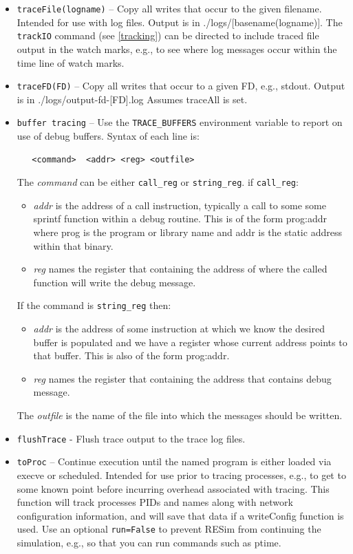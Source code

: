 \documentclass[titlepage]{article}
\begin{document}
\begin{itemize}
\item {\tt traceFile(logname)} – Copy all writes that occur to the given filename.  Intended for use with log files.  Output is in ./logs/[basename(logname)].
The {\tt trackIO} command (see \ref{tracking}) can be directed to include traced file output in the watch marks, e.g., to see where log messages occur within the
time line of watch marks.

\item {\tt traceFD(FD)} – Copy all writes that occur to a given FD, e.g., stdout.  Output is in ./logs/output-fd-[FD].log   Assumes traceAll is set.

\item {\tt buffer tracing} – Use the {\tt TRACE\_BUFFERS} environment variable to report on use of debug buffers.  Syntax of each line is:
\begin{verbatim}
   <command>  <addr> <reg> <outfile>
\end{verbatim}
The \textit{command} can be either {\tt call\_reg} or {\tt string\_reg}. if {\tt call\_reg}:
\begin{itemize}
\item \textit{addr} is the address of a call instruction, typically a call to some some sprintf function within a debug routine. This is of the form prog:addr where prog is the
program or library name and addr is the static address within that binary.
\item \textit{reg} names the register that containing the address of where the called function will write the debug message.
\end{itemize}
If the command is {\tt string\_reg} then:
\begin{itemize}
\item \textit{addr} is the address of some instruction at which we know the desired buffer is populated and we have a register whose current address points to that
buffer.  This is also of the form prog:addr.
\item \textit{reg} names the register that containing the address that contains debug message.
\end{itemize}

The \textit{outfile} is the name of the file into which the messages should be written.

\item {\tt flushTrace} - Flush trace output to the trace log files.

\item {\tt toProc} – Continue execution until the named program is either loaded via execve or scheduled.  Intended for use prior to tracing processes, e.g., to get to some known point before incurring overhead associated with tracing.   This function will track processes PIDs and names along with network configuration information, and will save that data if a writeConfig function is used.
Use an optional {\tt run=False} to prevent RESim from continuing the simulation, e.g., so that you can run commands such as ptime.


\end{itemize}
\end{document}
